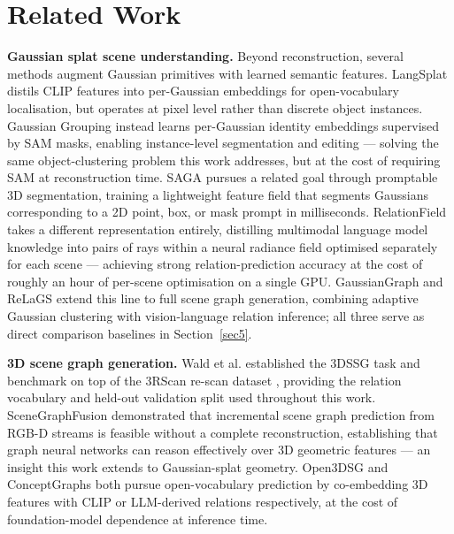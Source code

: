 \documentclass[sn-mathphys,Numbered]{sn-jnl}
\begin{document}
\FloatBarrier
\section{Related Work}\label{sec2}

\textbf{Gaussian splat scene understanding.} Beyond reconstruction, several methods augment Gaussian primitives with learned semantic features. LangSplat \cite{qin2024langsplat} distils CLIP features into per-Gaussian embeddings for open-vocabulary localisation, but operates at pixel level rather than discrete object instances. Gaussian Grouping \cite{ye2024gaussiangrouping} instead learns per-Gaussian identity embeddings supervised by SAM masks, enabling instance-level segmentation and editing --- solving the same object-clustering problem this work addresses, but at the cost of requiring SAM at reconstruction time. SAGA \cite{cen2025saga} pursues a related goal through promptable 3D segmentation, training a lightweight feature field that segments Gaussians corresponding to a 2D point, box, or mask prompt in milliseconds. RelationField \cite{koch2025relationfield} takes a different representation entirely, distilling multimodal language model knowledge into pairs of rays within a neural radiance field optimised separately for each scene --- achieving strong relation-prediction accuracy at the cost of roughly an hour of per-scene optimisation on a single GPU. GaussianGraph \cite{wang2025gaussiangraph} and ReLaGS \cite{xie2026relags} extend this line to full scene graph generation, combining adaptive Gaussian clustering with vision-language relation inference; all three serve as direct comparison baselines in Section~\ref{sec5}.

\textbf{3D scene graph generation.} Wald et al. \cite{wald2020dsssg} established the 3DSSG task and benchmark on top of the 3RScan re-scan dataset \cite{wald2019rio}, providing the relation vocabulary and held-out validation split used throughout this work. SceneGraphFusion \cite{wu2021scenegraphfusion} demonstrated that incremental scene graph prediction from RGB-D streams is feasible without a complete reconstruction, establishing that graph neural networks can reason effectively over 3D geometric features --- an insight this work extends to Gaussian-splat geometry. Open3DSG \cite{koch2024open3dsg} and ConceptGraphs \cite{gu2023conceptgraphs} both pursue open-vocabulary prediction by co-embedding 3D features with CLIP or LLM-derived relations respectively, at the cost of foundation-model dependence at inference time.
\end{document}
